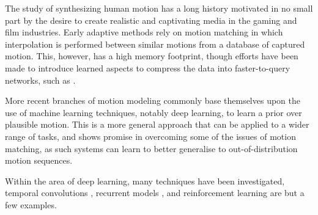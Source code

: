 The study of synthesizing human motion has a long history motivated in no small part by the desire to create realistic and captivating media in the gaming and film industries. Early adaptive methods rely on motion matching \cite{early_motion_matching} \cite{clavet_motion_matching} in which interpolation is performed between similar motions from a database of captured motion. This, however, has a high memory footprint, though efforts have been made to introduce learned aspects to compress the data into faster-to-query networks, such as \cite{holden_motion_matching}.


More recent branches of motion modeling commonly base themselves upon the use of machine learning techniques, notably deep learning, to learn a prior over plausible motion. This is a more general approach that can be applied to a wider range of tasks, and shows promise in overcoming some of the issues of motion matching, as such systems can learn to better generalise to out-of-distribution motion sequences.

Within the area of deep learning, many techniques have been investigated, temporal convolutions \cite{temporal_convolutions}, recurrent models \cite{recurrent_harvey_2020}, and reinforcement learning \cite{rl_cho} are but a few examples.
